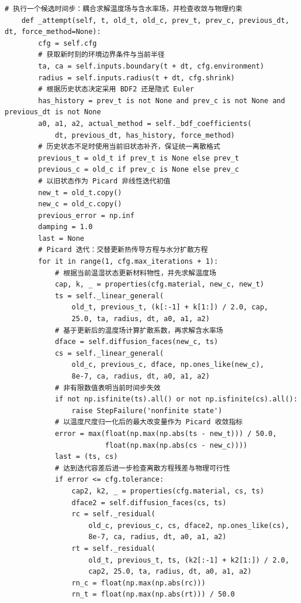 \begin{Verbatim}[fontsize=\scriptsize,breaklines=true,breakanywhere=true]
    # 执行一个候选时间步：耦合求解温度场与含水率场，并检查收敛与物理约束
    def _attempt(self, t, old_t, old_c, prev_t, prev_c, previous_dt, dt, force_method=None):
        cfg = self.cfg
        # 获取新时刻的环境边界条件与当前半径
        ta, ca = self.inputs.boundary(t + dt, cfg.environment)
        radius = self.inputs.radius(t + dt, cfg.shrink)
        # 根据历史状态决定采用 BDF2 还是隐式 Euler
        has_history = prev_t is not None and prev_c is not None and previous_dt is not None
        a0, a1, a2, actual_method = self._bdf_coefficients(
            dt, previous_dt, has_history, force_method)
        # 历史状态不足时使用当前旧状态补齐，保证统一离散格式
        previous_t = old_t if prev_t is None else prev_t
        previous_c = old_c if prev_c is None else prev_c
        # 以旧状态作为 Picard 非线性迭代初值
        new_t = old_t.copy()
        new_c = old_c.copy()
        previous_error = np.inf
        damping = 1.0
        last = None
        # Picard 迭代：交替更新热传导方程与水分扩散方程
        for it in range(1, cfg.max_iterations + 1):
            # 根据当前温湿状态更新材料物性，并先求解温度场
            cap, k, _ = properties(cfg.material, new_c, new_t)
            ts = self._linear_general(
                old_t, previous_t, (k[:-1] + k[1:]) / 2.0, cap,
                25.0, ta, radius, dt, a0, a1, a2)
            # 基于更新后的温度场计算扩散系数，再求解含水率场
            dface = self.diffusion_faces(new_c, ts)
            cs = self._linear_general(
                old_c, previous_c, dface, np.ones_like(new_c),
                8e-7, ca, radius, dt, a0, a1, a2)
            # 非有限数值表明当前时间步失效
            if not np.isfinite(ts).all() or not np.isfinite(cs).all():
                raise StepFailure('nonfinite state')
            # 以温度尺度归一化后的最大改变量作为 Picard 收敛指标
            error = max(float(np.max(np.abs(ts - new_t))) / 50.0,
                        float(np.max(np.abs(cs - new_c))))
            last = (ts, cs)
            # 达到迭代容差后进一步检查离散方程残差与物理可行性
            if error <= cfg.tolerance:
                cap2, k2, _ = properties(cfg.material, cs, ts)
                dface2 = self.diffusion_faces(cs, ts)
                rc = self._residual(
                    old_c, previous_c, cs, dface2, np.ones_like(cs),
                    8e-7, ca, radius, dt, a0, a1, a2)
                rt = self._residual(
                    old_t, previous_t, ts, (k2[:-1] + k2[1:]) / 2.0,
                    cap2, 25.0, ta, radius, dt, a0, a1, a2)
                rn_c = float(np.max(np.abs(rc)))
                rn_t = float(np.max(np.abs(rt))) / 50.0

\end{Verbatim}
